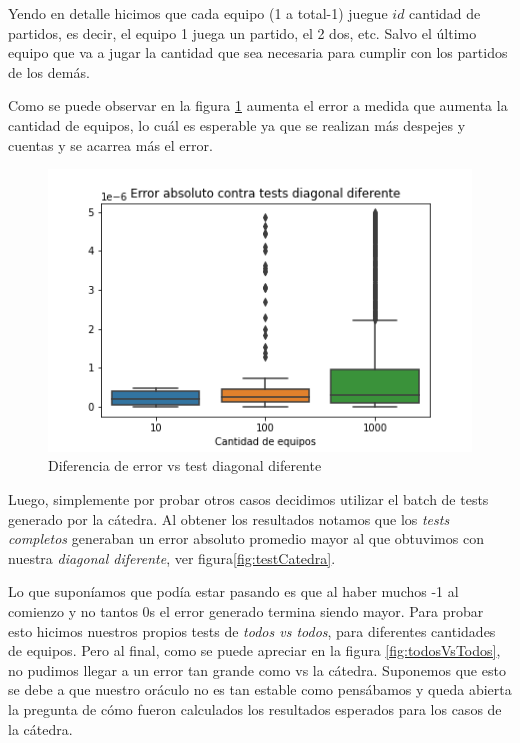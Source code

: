 Yendo en detalle hicimos que cada equipo (1 a total-1) juegue $id$ cantidad de partidos, es decir, el equipo 1 juega un partido, el 2 dos, etc. Salvo el último equipo que va a jugar la cantidad que sea necesaria para cumplir con los partidos de los demás.

Como se puede observar en la figura \ref{fig:bienDiferenteEnDiagonal} aumenta el error a medida que aumenta la cantidad de equipos, lo cuál es esperable ya que se realizan más despejes y cuentas y se acarrea más el error.\\

\begin{figure}[H]
 \centering
 \includegraphics[scale=0.7]{imagenes/bienDiferenteEnDiagonal.png}
 \caption{Diferencia de error vs test diagonal diferente}
 \label{fig:bienDiferenteEnDiagonal}
\end{figure}

Luego, simplemente por probar otros casos decidimos utilizar el batch de tests generado por la cátedra. Al obtener los resultados notamos que los \textit{tests completos} generaban un error absoluto promedio mayor al que obtuvimos con nuestra \textit{diagonal diferente}, ver figura\ref{fig:testCatedra}.

Lo que suponíamos que podía estar pasando es que al haber muchos -1 al comienzo y no tantos 0s el error generado termina siendo mayor. Para probar esto hicimos nuestros propios tests de \textit{todos vs todos}, para diferentes cantidades de equipos. Pero al final, como se puede apreciar en la figura \ref{fig:todosVsTodos}, no pudimos llegar a un error tan grande como vs la cátedra. Suponemos que esto se debe a que nuestro oráculo no es tan estable como pensábamos y queda abierta la pregunta de cómo fueron calculados los resultados esperados para los casos de la cátedra.

